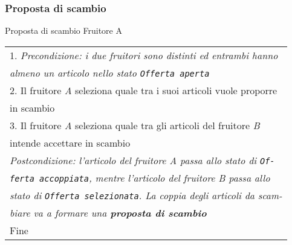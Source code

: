 \begin{minipage}{\textwidth}
    \subsubsection{Proposta di scambio}
    \usecase
        {Proposta di scambio}
        {
            Fruitore A\\
        }
        {
            \begin{tabular}{l}
                1. \textit{Precondizione: i due fruitori sono distinti ed entrambi hanno}\\
                \textit{almeno un articolo nello stato \texttt{Offerta aperta}}\\
                2. Il fruitore \textit{A} seleziona quale tra i suoi articoli vuole proporre\\
                in scambio\\
                3. Il fruitore \textit{A} seleziona quale tra gli articoli del fruitore \textit{B}\\
                intende accettare in scambio\\
                \textit{Postcondizione: l'articolo del fruitore \textit{A} passa allo stato di \texttt{Of-}}\\
                \textit{\texttt{ferta accoppiata}, mentre l'articolo del fruitore \textit{B} passa allo}\\
                \textit{stato di \texttt{Offerta selezionata}. La coppia degli articoli da scam-}\\
                \textit{biare va a formare una \textbf{proposta di scambio}}\\
                Fine
            \end{tabular}\\

            \\

}
\end{minipage}
